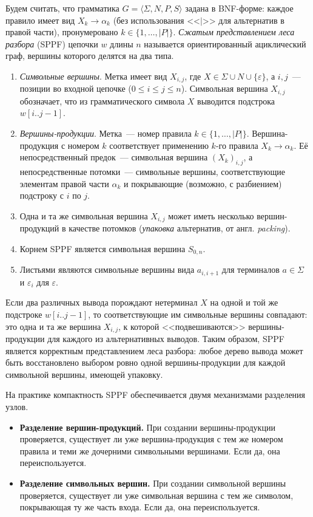 \begin{definition}
    \label{def:basicSPPF}
    Будем считать, что грамматика $G = \langle \Sigma, N, P, S \rangle$ задана в BNF-форме: каждое правило имеет вид $X_k \to \alpha_k$ (без использования <<$|$>> для альтернатив в правой части), пронумеровано $k \in \{1, \dots, |P|\}$.
    \emph{Сжатым представлением леса разбора} (SPPF) цепочки $w$ длины $n$ называется ориентированный ациклический граф, вершины которого делятся на два типа.
        \begin{enumerate}
            \item \emph{Символьные вершины}. Метка имеет вид $X_{i,j}$, где $X \in \Sigma \cup N \cup \{\varepsilon\}$, а $i, j$~--- позиции во входной цепочке ($0 \leq i \leq j \leq n$). Символьная вершина $X_{i,j}$ обозначает, что из грамматического символа $X$ выводится подстрока $w[i..j-1]$.
            \item \emph{Вершины-продукции}. Метка~--- номер правила $k \in \{1, \dots, |P|\}$. Вершина-продукция с номером $k$ соответствует применению $k$-го правила $X_k \to \alpha_k$. Её непосредственный предок~--- символьная вершина $(X_k)_{i,j}$, а непосредственные потомки~--- символьные вершины, соответствующие элементам правой части $\alpha_k$ и покрывающие (возможно, с разбиением) подстроку с $i$ по $j$.
            \item Одна и та же символьная вершина $X_{i,j}$ может иметь несколько вершин-продукций в качестве потомков (\emph{упаковка} альтернатив, от англ. \emph{packing}).
            \item Корнем SPPF является символьная вершина $S_{0,n}$.
            \item Листьями являются символьные вершины вида $a_{i,i+1}$ для терминалов $a \in \Sigma$ и $\varepsilon_i$ для $\varepsilon$.
        \end{enumerate}
\end{definition}

Если два различных вывода порождают нетерминал $X$ на одной и той же подстроке $w[i..j-1]$, то соответствующие им символьные вершины совпадают: это одна и та же вершина $X_{i,j}$, к которой <<подвешиваются>> вершины-продукции для каждого из альтернативных выводов.
Таким образом, SPPF является корректным представлением леса разбора: любое дерево вывода может быть восстановлено выбором ровно одной вершины-продукции для каждой символьной вершины, имеющей упаковку.

На практике компактность SPPF обеспечивается двумя механизмами разделения узлов.
\begin{itemize}
    \item \textbf{Разделение вершин-продукций.} При создании вершины-продукции проверяется, существует ли уже вершина-продукция с тем же номером правила и теми же дочерними символьными вершинами. Если да, она переиспользуется.
    \item \textbf{Разделение символьных вершин.} При создании символьной вершины проверяется, существует ли уже символьная вершина с тем же символом, покрывающая ту же часть входа. Если да, она переиспользуется.
\end{itemize}

